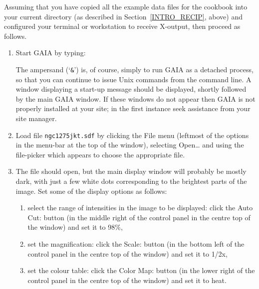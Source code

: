 \documentclass[twoside,11pt]{starlink}
\begin{document}
Assuming that you have copied all the example data files for the cookbook
into your current directory (as described in Section~\ref{INTRO_RECIP},
above) and configured your terminal or workstation to receive X-output,
then proceed as follows.

\begin{enumerate}

  \item Start GAIA by typing:

  \begin{terminalv}
  \end{terminalv}

   The ampersand (`\texttt{\&}') is, of course, simply to run GAIA as a
   detached process, so that you can continue to issue Unix commands
   from the command line.  A window displaying a start-up message should
   be displayed, shortly followed by the main GAIA window.  If these
   windows do not appear then GAIA is not properly installed at your site;
   in the first instance seek assistance from your site manager.

  \item Load file \texttt{ngc1275jkt.sdf} by clicking the \textsf{File} menu
   (leftmost of the options in the menu-bar at the top of the window),
   selecting \textsf{Open\ldots} and using the file-picker which appears to
   choose the appropriate file.

  \item The file should open, but the main display window will probably
   be mostly dark, with just a few white dots corresponding to the
   brightest parts of the image.  Set some of the display options as
   follows:

  \begin{enumerate}

    \item select the range of intensities in the image to be displayed:
     click the \textsf{Auto Cut:} button (in the middle right of the control
     panel in the centre top of the window) and set it to \textsf{98\%},

    \item set the magnification: click the \textsf{Scale:} button (in the
     bottom left of the control panel in the centre top of the window) and
     set it to \textsf{1/2x},

    \item set the colour table: click the \textsf{Color Map:} button (in the
     lower right of the control panel in the centre top of the window) and
     set it to \textsf{heat}.


\end{enumerate}
\end{enumerate}
\end{document}
